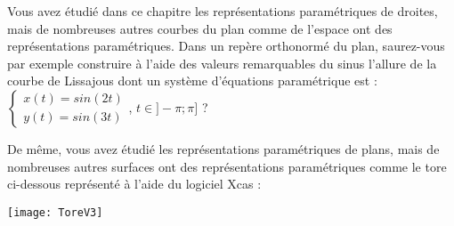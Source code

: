 \begin{enigme}
  Vous avez étudié dans ce chapitre les représentations paramétriques
  de droites, mais de nombreuses autres courbes du plan comme de
  l'espace ont des représentations paramétriques.  Dans un repère
  orthonormé du plan, saurez-vous par exemple construire à l'aide des
  valeurs remarquables du sinus l'allure de la courbe de Lissajous
  dont un
  système d'équations paramétrique est : \\
  $\begin{cases}x(t)=sin(2t)\\y(t)=sin(3t) \end{cases}$,
  $t\in]-\pi;\pi]$ ?

  \smallskip

  De même, vous avez étudié les représentations paramétriques de
  plans, mais de nombreuses autres surfaces ont des représentations
  paramétriques comme le tore ci-dessous représenté à l'aide du
  logiciel Xcas :

  \begin{center}
    \texttt{[image: ToreV3]}
  \end{center}
\end{enigme}



